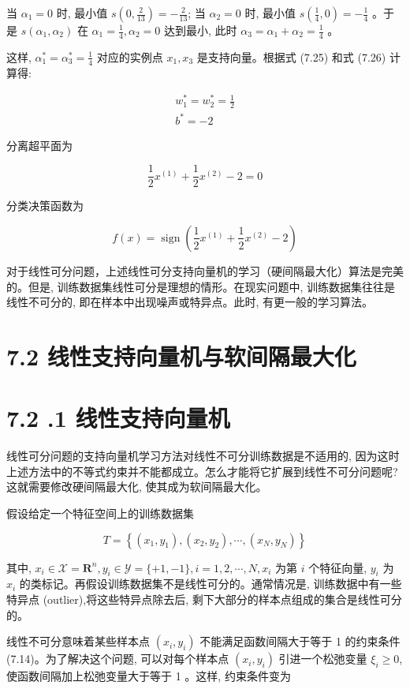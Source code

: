 \documentclass[10pt]{article}
\begin{document}
当 $\alpha_{1}=0$ 时, 最小值 $s\left(0, \frac{2}{13}\right)=-\frac{2}{13}$; 当 $\alpha_{2}=0$ 时, 最小值 $s\left(\frac{1}{4}, 0\right)=-\frac{1}{4}$ 。于是 $s\left(\alpha_{1}, \alpha_{2}\right)$ 在 $\alpha_{1}=\frac{1}{4}, \alpha_{2}=0$ 达到最小, 此时 $\alpha_{3}=\alpha_{1}+\alpha_{2}=\frac{1}{4}$ 。

这样, $\alpha_{1}^{*}=\alpha_{3}^{*}=\frac{1}{4}$ 对应的实例点 $x_{1}, x_{3}$ 是支持向量。根据式 (7.25) 和式 (7.26) 计算得:

$$
\begin{gathered}
w_{1}^{*}=w_{2}^{*}=\frac{1}{2} \\
b^{*}=-2
\end{gathered}
$$

分离超平面为

$$
\frac{1}{2} x^{(1)}+\frac{1}{2} x^{(2)}-2=0
$$

分类决策函数为

$$
f(x)=\operatorname{sign}\left(\frac{1}{2} x^{(1)}+\frac{1}{2} x^{(2)}-2\right)
$$

对于线性可分问题，上述线性可分支持向量机的学习（硬间隔最大化）算法是完美的。但是, 训练数据集线性可分是理想的情形。在现实问题中, 训练数据集往往是线性不可分的, 即在样本中出现噪声或特异点。此时, 有更一般的学习算法。

\section*{7.2 线性支持向量机与软间隔最大化}
\section*{7.2 .1 线性支持向量机}
线性可分问题的支持向量机学习方法对线性不可分训练数据是不适用的, 因为这时上述方法中的不等式约束并不能都成立。怎么才能将它扩展到线性不可分问题呢? 这就需要修改硬间隔最大化, 使其成为软间隔最大化。

假设给定一个特征空间上的训练数据集

$$
T=\left\{\left(x_{1}, y_{1}\right),\left(x_{2}, y_{2}\right), \cdots,\left(x_{N}, y_{N}\right)\right\}
$$

其中, $x_{i} \in \mathcal{X}=\boldsymbol{R}^{n}, y_{i} \in \mathcal{Y}=\{+1,-1\}, i=1,2, \cdots, N, x_{i}$ 为第 $i$ 个特征向量, $y_{i}$ 为 $x_{i}$ 的类标记。再假设训练数据集不是线性可分的。通常情况是, 训练数据中有一些特异点 (outlier),将这些特异点除去后, 剩下大部分的样本点组成的集合是线性可分的。

线性不可分意味着某些样本点 $\left(x_{i}, y_{i}\right)$ 不能满足函数间隔大于等于 1 的约束条件 (7.14)。为了解决这个问题, 可以对每个样本点 $\left(x_{i}, y_{i}\right)$ 引进一个松弛变量 $\xi_{i} \geqslant 0$, 使函数间隔加上松弛变量大于等于 1 。这样, 约束条件变为
\end{document}
